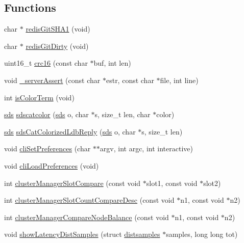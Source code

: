 \subsection*{Functions}
\begin{DoxyCompactItemize}
\item 
char $\ast$ \hyperlink{redis-cli_8c_a598b97b058f3470583dd1b6fc6498102}{redis\+Git\+S\+H\+A1} (void)
\item 
char $\ast$ \hyperlink{redis-cli_8c_a1dc767d40b8708fecbc214aafd78fd71}{redis\+Git\+Dirty} (void)
\item 
uint16\+\_\+t \hyperlink{redis-cli_8c_a1af61bf3da70181a7591b0f5758913a3}{crc16} (const char $\ast$buf, int len)
\item 
void \hyperlink{redis-cli_8c_ace38bb59b1a740e3b0db1cf149956c67}{\+\_\+server\+Assert} (const char $\ast$estr, const char $\ast$file, int line)
\item 
int \hyperlink{redis-cli_8c_a714e96cca59b2378fae3f82a093d6d55}{is\+Color\+Term} (void)
\item 
\hyperlink{sds_8h_ad69abac3df4532879db9642c95f5ef6f}{sds} \hyperlink{redis-cli_8c_a5e975ae7748971b112576394ed9446be}{sdscatcolor} (\hyperlink{sds_8h_ad69abac3df4532879db9642c95f5ef6f}{sds} o, char $\ast$s, size\+\_\+t len, char $\ast$color)
\item 
\hyperlink{sds_8h_ad69abac3df4532879db9642c95f5ef6f}{sds} \hyperlink{redis-cli_8c_a7c60ad60c617f931dc73df54d36852c4}{sds\+Cat\+Colorized\+Ldb\+Reply} (\hyperlink{sds_8h_ad69abac3df4532879db9642c95f5ef6f}{sds} o, char $\ast$s, size\+\_\+t len)
\item 
void \hyperlink{redis-cli_8c_a07d4e3ca456b6b137a92e9c7fc53ab15}{cli\+Set\+Preferences} (char $\ast$$\ast$argv, int argc, int interactive)
\item 
void \hyperlink{redis-cli_8c_ae90b8c7a065096325ddb291a04ac6cef}{cli\+Load\+Preferences} (void)
\item 
int \hyperlink{redis-cli_8c_a5ff8171578d33bc43617b2d4fc9a75b5}{cluster\+Manager\+Slot\+Compare} (const void $\ast$slot1, const void $\ast$slot2)
\item 
int \hyperlink{redis-cli_8c_a63abcc059e6d70d890f2e407b0c2af81}{cluster\+Manager\+Slot\+Count\+Compare\+Desc} (const void $\ast$n1, const void $\ast$n2)
\item 
int \hyperlink{redis-cli_8c_a472cee2ec11ec44da4b24a64cf34ab9c}{cluster\+Manager\+Compare\+Node\+Balance} (const void $\ast$n1, const void $\ast$n2)
\item 
void \hyperlink{redis-cli_8c_aa482d47975ad5eaa1358dae2e61dc210}{show\+Latency\+Dist\+Samples} (struct \hyperlink{structdistsamples}{distsamples} $\ast$samples, long long tot)
$$
\end{DoxyCompactItemize}
